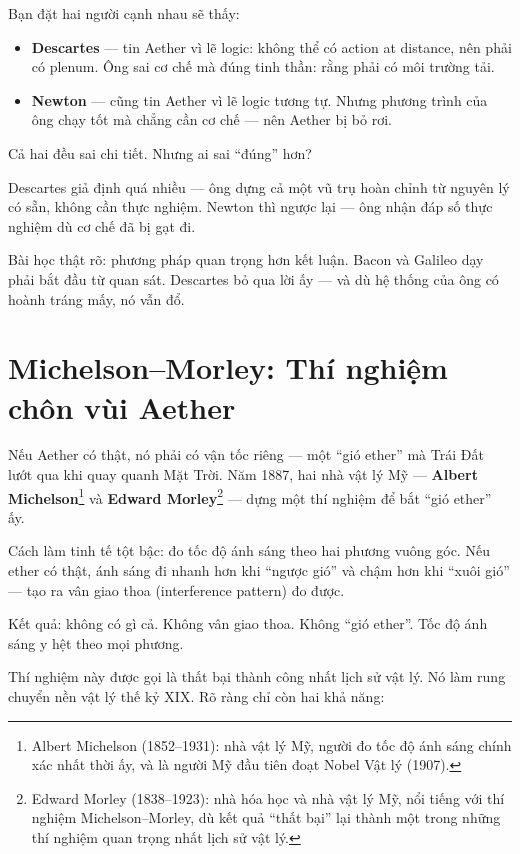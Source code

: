 Bạn đặt hai người cạnh nhau sẽ thấy:

\begin{itemize}
  \item \textbf{Descartes} — tin Aether vì lẽ logic: không thể có action at distance, nên phải có plenum. Ông sai cơ chế mà đúng tinh thần: rằng phải có môi trường tải.
  \item \textbf{Newton} — cũng tin Aether vì lẽ logic tương tự. Nhưng phương trình của ông chạy tốt mà chẳng cần cơ chế — nên Aether bị bỏ rơi.
\end{itemize}

Cả hai đều sai chi tiết. Nhưng ai sai “đúng” hơn?

Descartes giả định quá nhiều — ông dựng cả một vũ trụ hoàn chỉnh từ nguyên lý có sẵn, không cần thực nghiệm. Newton thì ngược lại — ông nhận đáp số thực nghiệm dù cơ chế đã bị gạt đi.

Bài học thật rõ: phương pháp quan trọng hơn kết luận. Bacon và Galileo dạy phải bắt đầu từ quan sát. Descartes bỏ qua lời ấy — và dù hệ thống của ông có hoành tráng mấy, nó vẫn đổ.


\section{Michelson–Morley: Thí nghiệm chôn vùi Aether}

Nếu Aether có thật, nó phải có vận tốc riêng — một “gió ether” mà Trái Đất lướt qua khi quay quanh Mặt Trời. Năm 1887, hai nhà vật lý Mỹ — \textbf{Albert Michelson}\footnote{Albert Michelson (1852--1931): nhà vật lý Mỹ, người đo tốc độ ánh sáng chính xác nhất thời ấy, và là người Mỹ đầu tiên đoạt Nobel Vật lý (1907).} và \textbf{Edward Morley}\footnote{Edward Morley (1838--1923): nhà hóa học và nhà vật lý Mỹ, nổi tiếng với thí nghiệm Michelson--Morley, dù kết quả “thất bại” lại thành một trong những thí nghiệm quan trọng nhất lịch sử vật lý.} — dựng một thí nghiệm để bắt “gió ether” ấy.

Cách làm tinh tế tột bậc: đo tốc độ ánh sáng theo hai phương vuông góc. Nếu ether có thật, ánh sáng đi nhanh hơn khi “ngược gió” và chậm hơn khi “xuôi gió” — tạo ra vân giao thoa (interference pattern) đo được.

Kết quả: không có gì cả. Không vân giao thoa. Không “gió ether”. Tốc độ ánh sáng y hệt theo mọi phương.

Thí nghiệm này được gọi là thất bại thành công nhất lịch sử vật lý. Nó làm rung chuyển nền vật lý thế kỷ XIX. Rõ ràng chỉ còn hai khả năng:

